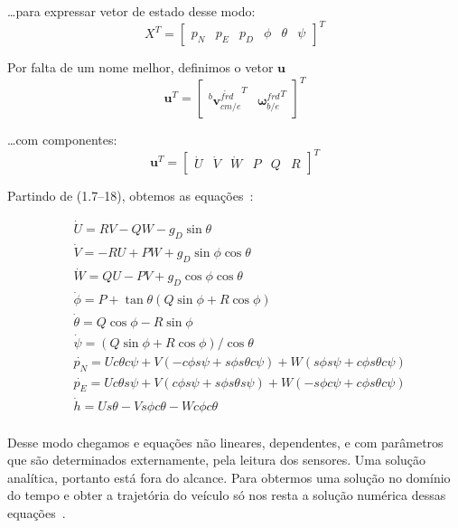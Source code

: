 \ldots para expressar vetor de estado desse modo:
\begin{equation*}
    X^{T} = \begin{bmatrix} p_{N} &  p_{E} & p_{D} & \phi & \theta & \psi \end{bmatrix}^{T}
\end{equation*}

Por falta de um nome melhor, definimos o vetor \(\mathbf{u}\)
\begin{equation*}
    \mathbf{u}^{T} = \begin{bmatrix} {^{b}\dot{{\mathbf{v}}^{frd}_{cm/e}}^{T}} & {\mathbf{\omega}^{frd}_{b/e}}^{T} \end{bmatrix}^{T}
\end{equation*}

\ldots com componentes:
\begin{equation*}
    \mathbf{u}^{T} = \begin{bmatrix} \dot{U} & \dot{V} & \dot{W} & P & Q & R \end{bmatrix}^{T}
\end{equation*}

Partindo de (1.7--18), obtemos as equações~\cite{Stevens2016}:

\begin{align*}
    &\dot{U}      =  RV - QW -g_{D} \sin{\theta} \\
    &\dot{V}      = -RU + PW +g_{D} \sin{\phi}\cos{\theta} \\
    &\dot{W}      =  QU - PV +g_{D} \cos{\phi}\cos{\theta} \\
    &\dot{\phi}   =  P + \tan{\theta} \left( Q \sin{\phi} + R \cos{\phi} \right) \\
    &\dot{\theta} =  Q \cos{\phi} - R \sin{\phi} \\
    &\dot{\psi}   =  \left( Q \sin{\phi} + R \cos{\phi} \right) / \cos{\theta} \\
    &\dot{p_{N}}  =  U c \theta c \psi  + V ( -c \phi s \psi + s \phi s \theta c \psi ) + W ( s \phi s \psi + c \phi s \theta c \psi) \\
    &\dot{p_{E}}  =  U c \theta s \psi  + V (  c \phi s \psi + s \phi s \theta s \psi ) + W (-s \phi c \psi + c \phi s \theta c \psi) \\
    &\dot{h}      =  U s \theta - V s \phi c \theta - W c \phi c \theta \\
\end{align*}

Desse modo chegamos e equações não lineares, dependentes, e com parâmetros que são determinados externamente, pela leitura dos sensores. Uma solução analítica, portanto está fora do alcance. Para obtermos uma solução no domínio do tempo e obter a trajetória do veículo só nos resta a solução numérica dessas equações~\cite{Stevens2016}.

